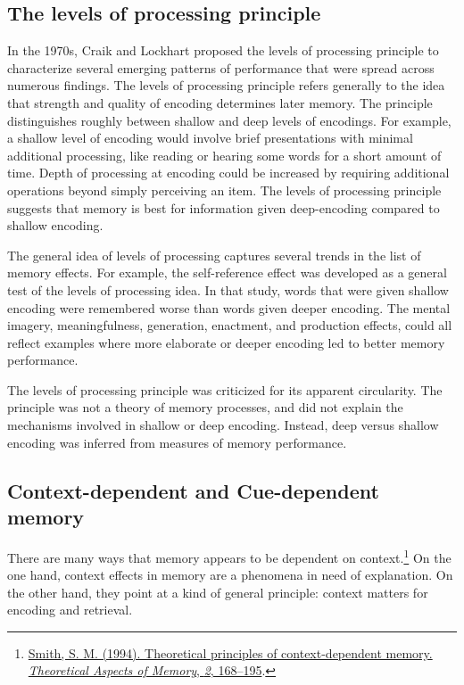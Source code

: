 \documentclass[
  oneside,
  12pt]{crumpbook}
\begin{document}
\hypertarget{the-levels-of-processing-principle}{%
\subsection{The levels of processing principle}\label{the-levels-of-processing-principle}}

In the 1970s, Craik and Lockhart proposed the levels of processing principle to characterize several emerging patterns of performance that were spread across numerous findings. The levels of processing principle refers generally to the idea that strength and quality of encoding determines later memory. The principle distinguishes roughly between shallow and deep levels of encodings. For example, a shallow level of encoding would involve brief presentations with minimal additional processing, like reading or hearing some words for a short amount of time. Depth of processing at encoding could be increased by requiring additional operations beyond simply perceiving an item. The levels of processing principle suggests that memory is best for information given deep-encoding compared to shallow encoding.

The general idea of levels of processing captures several trends in the list of memory effects. For example, the self-reference effect was developed as a general test of the levels of processing idea. In that study, words that were given shallow encoding were remembered worse than words given deeper encoding. The mental imagery, meaningfulness, generation, enactment, and production effects, could all reflect examples where more elaborate or deeper encoding led to better memory performance.

The levels of processing principle was criticized for its apparent circularity. The principle was not a theory of memory processes, and did not explain the mechanisms involved in shallow or deep encoding. Instead, deep versus shallow encoding was inferred from measures of memory performance.

\hypertarget{context-dependent-and-cue-dependent-memory}{%
\subsection{Context-dependent and Cue-dependent memory}\label{context-dependent-and-cue-dependent-memory}}

There are many ways that memory appears to be dependent on context.\footnote{\protect\hyperlink{ref-smithTheoreticalPrinciplesContextdependent1994}{Smith, S. M. (1994). Theoretical principles of context-dependent memory. \emph{Theoretical Aspects of Memory}, \emph{2}, 168--195}.} On the one hand, context effects in memory are a phenomena in need of explanation. On the other hand, they point at a kind of general principle: context matters for encoding and retrieval.
\end{document}
